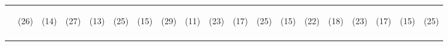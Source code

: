 \begin{tabular}{lcccccccccccccccccc}
 & \begin{footnotesize}(26)\end{footnotesize} & \begin{footnotesize}(14)\end{footnotesize} & \begin{footnotesize}(27)\end{footnotesize} & \begin{footnotesize}(13)\end{footnotesize} & \begin{footnotesize}(25)\end{footnotesize} & \begin{footnotesize}(15)\end{footnotesize} & \begin{footnotesize}(29)\end{footnotesize} & \begin{footnotesize}(11)\end{footnotesize} & \begin{footnotesize}(23)\end{footnotesize} & \begin{footnotesize}(17)\end{footnotesize} & \begin{footnotesize}(25)\end{footnotesize} & \begin{footnotesize}(15)\end{footnotesize} & \begin{footnotesize}(22)\end{footnotesize} & \begin{footnotesize}(18)\end{footnotesize} & \begin{footnotesize}(23)\end{footnotesize} & \begin{footnotesize}(17)\end{footnotesize} & \begin{footnotesize}(15)\end{footnotesize} & \begin{footnotesize}(25)\end{footnotesize}\\
\noalign{\smallskip}\hline\end{tabular}\\
